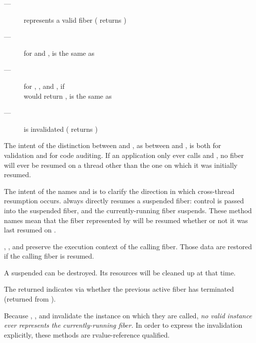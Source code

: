 \requires
\begin{description}
    \item[---]  represents a valid fiber ( returns )
    \item[---] for \resume and \resumewith, \currthread is the same as
              \lastthread
    \item[---] for \resume, \resumewith, \xtresume and \xtresumewith, if\\
              \canxtresume would return , \currthread is
              the same as \lastthread
\end{description}

\postcond
\begin{description}
    \item[---]  is invalidated ( returns )
\end{description}

\remarks
\newline
The intent of the distinction between \resume and \xtresume, as
between \resumewith and \xtresumewith, is both for validation and for code
auditing. If an application only ever calls \resume and \resumewith, no fiber
will ever be resumed on a thread other than the one on which it was initially
resumed.

The intent of the names \xtresume and \xtresumewith is to clarify the
direction in which cross-thread resumption occurs. \Currthread always
directly resumes a suspended fiber: control is passed into the suspended
fiber, and the currently-running fiber suspends. These method names mean that
the fiber represented by  will be resumed whether or not it was
last resumed on \currthread.

\resume, \resumewith, \xtresume and \xtresumewith preserve the execution
context of the calling fiber. Those data are restored if the calling fiber is
resumed.

A suspended  can be destroyed. Its resources will be cleaned
up at that time.

The returned  indicates via  whether the previous active
fiber has terminated (returned from \entryfn).

Because \resume, \resumewith, \xtresume and \xtresumewith invalidate the
instance on which they are called, \emph{no valid \fiber instance ever
represents the currently-running fiber.} In order to express the invalidation
explicitly, these methods are rvalue-reference qualified.

